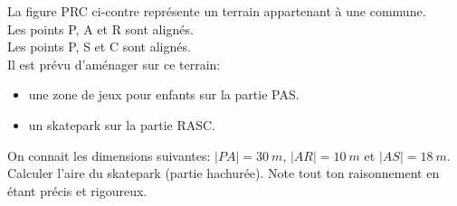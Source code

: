 %
%
    \begin{minipage}{.65\linewidth}
        La figure PRC ci-contre représente un terrain appartenant à une commune.\\
        Les points P, A et R sont alignés.\\
        Les points P, S et C sont alignés.\\
        Il est prévu d'aménager sur ce terrain:
        \begin{itemize}
            \item une zone de jeux pour enfants sur la partie PAS.
            \item un skatepark sur la partie RASC.
        \end{itemize}
    \end{minipage}
    \hfill
    \begin{minipage}{.3\linewidth}
        
    \end{minipage}

    On connait les dimensions suivantes: $|PA|=\SI{30}{m}$, $|AR|=\SI{10}{m}$ et $|AS|=\SI{18}{m}$.\\
    Calculer l'aire du skatepark (partie hachurée). Note tout ton raisonnement en étant précis et rigoureux.\\
